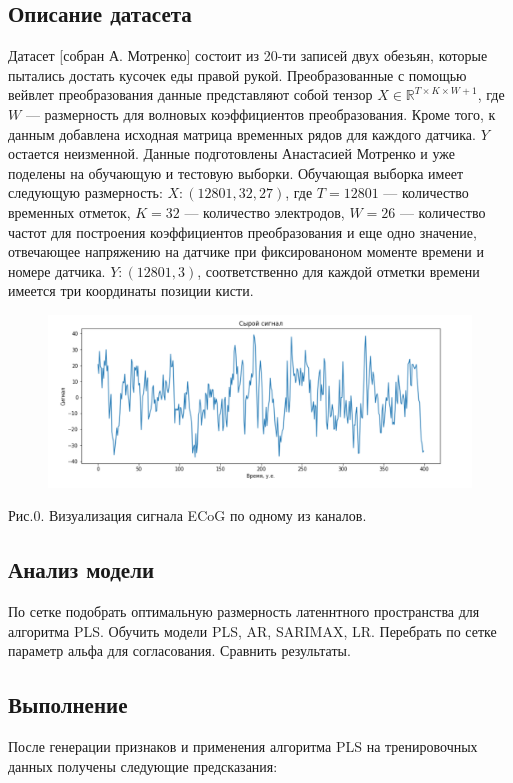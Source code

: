 \documentclass{article}
\begin{document}
\subsection{Описание датасета}
Датасет [собран А. Мотренко] состоит из 20-ти записей двух обезьян, которые пытались достать кусочек еды правой рукой. Преобразованные с помощью вейвлет преобразования данные представляют собой тензор $X \in \mathds{R}^{T \times K \times W+1}$, где $W$ --- размерность для волновых коэффициентов преобразования. Кроме того, к данным добавлена исходная матрица временных рядов для каждого датчика. $Y$ остается неизменной. Данные подготовлены Анастасией Мотренко и уже поделены на обучающую и тестовую выборки. Обучающая выборка имеет следующую размерность: $X:(12801, 32, 27)$, где $T = 12801$ --- количество временных отметок, $K = 32$ --- количество электродов, $W = 26$ --- количество частот для построения коэффициентов преобразования и еще одно значение, отвечающее напряжению на датчике при фиксированоном моменте времени и номере датчика. $Y:(12801, 3)$, соответственно для каждой отметки времени имеется три координаты позиции кисти. 
\begin{figure}[H]
\includegraphics[scale=0.5]{images/8.png}
\end{figure}
Рис.0. Визуализация сигнала ECoG по одному из каналов.
\subsection{Анализ модели}
По сетке подобрать оптимальную размерность латеннтного пространства для алгоритма PLS. Обучить модели PLS, AR, SARIMAX, LR. Перебрать по сетке параметр альфа для согласования. Сравнить результаты.
\subsection{Выполнение}
После генерации признаков и применения алгоритма PLS на тренировочных данных получены следующие предсказания:
\end{document}
